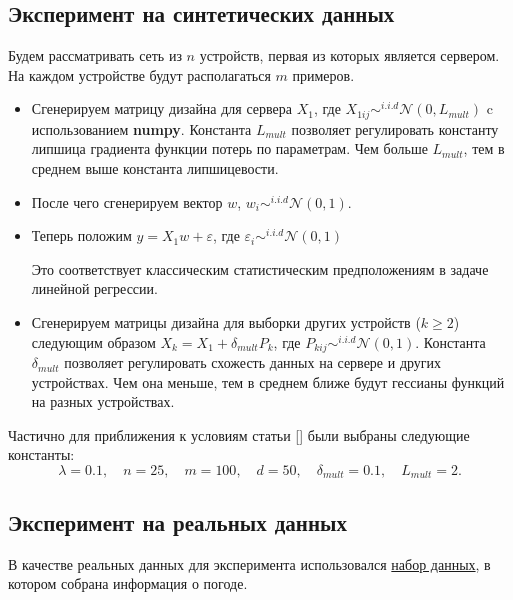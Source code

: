 \documentclass[a4paper,12pt]{extarticle}
\begin{document}
    \subsection{Эксперимент на синтетических данных}
    Будем рассматривать сеть из $n$ устройств, первая из которых является сервером.
    На каждом устройстве будут располагаться $m$ примеров.
        
    \begin{itemize}
    \item  Сгенерируем матрицу дизайна для сервера $X_1$,
    где $X_{1ij} \sim^{i.i.d} \mathcal{N}(0, L_{mult})$ c использованием  \textbf{numpy}.
    Константа $L_{mult}$ позволяет регулировать константу липшица градиента функции потерь по параметрам.
    Чем больше $L_{mult}$, тем в среднем выше константа липшицевости. 
    
    \item После чего сгенерируем вектор $w$, $ w_i \sim^{i.i.d} \mathcal{N}(0, 1)$. 
    
    \item Теперь положим $y = X_1w + \varepsilon$, где $\varepsilon_i \sim^{i.i.d} \mathcal{N}(0, 1)$
    \newcommand\tab[1][1cm]{\hspace*{#1}}
    

    \tab{} Это соответствует классическим статистическим предположениям в задаче линейной регрессии. 

    \item Сгенерируем матрицы дизайна для выборки других устройств ($k \geq 2$) следующим образом $X_k = X_1 + \delta_{mult} P_k$,
     где $P_{kij} \sim^{i.i.d} \mathcal{N}(0, 1)$.
    Константа $\delta_{mult}$ позволяет регулировать схожесть данных на сервере и других устройствах.
    Чем она меньше, тем в среднем ближе будут гессианы функций на разных устройствах. 
    
    \end{itemize}

    Частично для приближения к условиям статьи [] были выбраны следующие константы: 
    $$ \textstyle
    \lambda = 0.1,
    \quad n = 25,
    \quad m = 100,
    \quad d = 50,
    \quad \delta_{mult} = 0.1,
    \quad L_{mult} = 2.
    $$
    \subsection{Эксперимент на реальных данных}
    В качестве реальных данных для эксперимента использовался
    \href{https://www.kaggle.com/datasets/budincsevity/szeged-weather/data}{набор данных},
    в котором собрана информация о погоде. 
 
\end{document}
